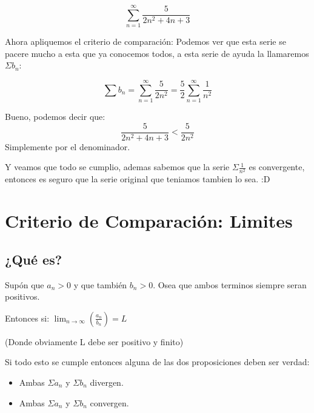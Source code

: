 \documentclass[12pt]{report}							    %
\begin{document}
    \begin{equation*}
        \sum_{n=1}^{\infty} \frac{5}{2n^2 +4n +3}
    \end{equation*}

    Ahora apliquemos el criterio de comparación: Podemos ver que esta serie se pacere mucho a esta que ya conocemos todos, a esta serie de ayuda la llamaremos $\Sigma b_n$:

    \begin{equation*}
        \sum b_n = \sum_{n=1}^{\infty} \frac{5}{2n^2} = \frac{5}{2}\sum_{n=1}^{\infty} \frac{1}{n^2}
    \end{equation*}

    Bueno, podemos decir que:
    \begin{equation*}
        \frac{5}{2n^2 +4n +3} < \frac{5}{2n^2}
    \end{equation*}
    Simplemente por el denominador.

    Y veamos que todo se cumplio, ademas sabemos que la serie $\Sigma \frac{1}{n^2}$ es convergente, entonces es seguro que la serie original que teniamos tambien lo sea. :D



    \clearpage
    \section{Criterio de Comparación: Limites}


    \subsection{¿Qué es?}
    Supón que $a _n > 0$ y que también $b_n > 0$. Osea que ambos terminos siempre seran positivos.

    Entonces si:
    $\lim_{n \to \infty} \left( \frac{a_n}{b_n} \right) = L$

    (Donde obviamente L debe ser positivo y finito)

    Si todo esto se cumple entonces alguna de las dos proposiciones deben ser verdad:
    \begin{itemize}
        \item Ambas $\Sigma a_n$ y $\Sigma b_n$ divergen.
        \item Ambas $\Sigma a_n$ y $\Sigma b_n$ convergen.
    \end{itemize}
\end{document}
